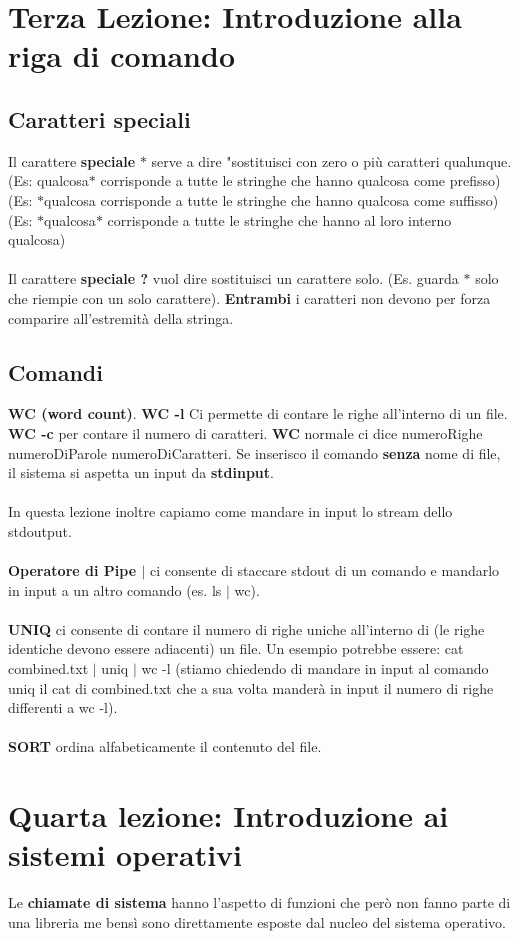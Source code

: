 \documentclass{article}
\begin{document}
\section{Terza Lezione: Introduzione alla riga di comando}
\subsection{Caratteri speciali}
Il carattere \textbf{speciale} $\ast$ serve a dire "sostituisci con zero o più caratteri qualunque. (Es: qualcosa$\ast$ corrisponde a tutte le stringhe che hanno qualcosa come prefisso) (Es: $\ast$qualcosa corrisponde a tutte le stringhe che hanno qualcosa come suffisso) (Es: $\ast$qualcosa$\ast$ corrisponde a tutte le stringhe che hanno al loro interno qualcosa)\\\\
Il carattere \textbf{speciale ?} vuol dire sostituisci un carattere solo. (Es. guarda $\ast$ solo che riempie con un solo carattere). \textbf{Entrambi} i caratteri non devono per forza comparire all'estremità della stringa.
\subsection{Comandi}
\textbf{WC (word count)}. \textbf{WC -l} Ci permette di contare le righe all'interno di un file. \textbf{WC -c} per contare il numero di caratteri. \textbf{WC} normale ci dice numeroRighe numeroDiParole numeroDiCaratteri. Se inserisco il comando \textbf{senza} nome di file, il sistema si aspetta un input da \textbf{stdinput}.\\\\
In questa lezione inoltre capiamo come mandare in input lo stream dello stdoutput.\\\\
\textbf{Operatore di Pipe $|$} ci consente di staccare stdout di un comando e mandarlo in input a un altro comando (es. ls $|$ wc).\\\\
\textbf{UNIQ} ci consente di contare il numero di righe uniche all'interno di (le righe identiche devono essere adiacenti) un file. Un esempio potrebbe essere: cat combined.txt $|$ uniq $|$ wc -l (stiamo chiedendo di mandare in input al comando uniq il cat di combined.txt che a sua volta manderà in input il numero di righe differenti a wc -l).\\\\
\textbf{SORT} ordina alfabeticamente il contenuto del file.
\section{Quarta lezione: Introduzione ai sistemi operativi}
Le \textbf{chiamate di sistema} hanno l'aspetto di funzioni che però non fanno parte di una libreria me bensì sono direttamente esposte dal nucleo del sistema operativo.
\end{document}
